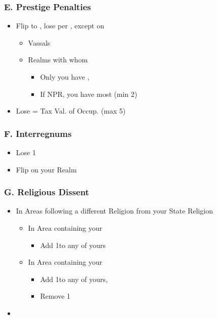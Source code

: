 \documentclass[10pt]{article}
\begin{document}
\framebreak

\subsubsection*{E. Prestige Penalties}
\begin{itemize}
	\item Flip \disputedsuccession to \marriage, lose  per \disputedsuccession, except \disputedsuccession on
	\begin{itemize}
		\item Vassals
		\item Realms with whom
		\begin{itemize}
			\item Only you have \alliance, 
			\item If NPR, you have most \influence (min 2)
		\end{itemize}
	\end{itemize}
	\item Lose \prestige = Tax Val. of Occup. \towns (max 5)
\end{itemize}

\subsubsection*{F. Interregnums}
\begin{itemize}
	\item Lose 1\stability
	\item Flip \marriages on your Realm
\end{itemize}

\subsubsection*{G. Religious Dissent}
\begin{itemize}
	\item In Areas following a different Religion from your State Religion
	\begin{itemize}
		\item In  Area containing your \towns
		\begin{itemize}
			\item Add 1\unrest to any \town of yours
		\end{itemize}
		\item In  Area containing your \vassals
		\begin{itemize}
			\item Add 1\unrest to any \vassal of yours, 
			\item Remove 1\influence
		\end{itemize}
	\end{itemize}
	\item {}
\end{itemize}
\end{document}
